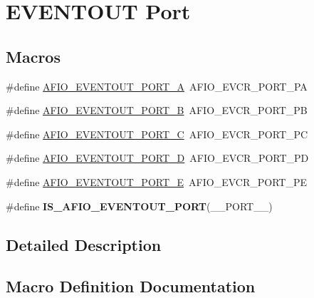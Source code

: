 \hypertarget{group___g_p_i_o_ex___e_v_e_n_t_o_u_t___p_o_r_t}{}\section{E\+V\+E\+N\+T\+O\+UT Port}
\label{group___g_p_i_o_ex___e_v_e_n_t_o_u_t___p_o_r_t}
\subsection*{Macros}
\begin{DoxyCompactItemize}
\item 
\#define \hyperlink{group___g_p_i_o_ex___e_v_e_n_t_o_u_t___p_o_r_t_ga923160935b624e039735fb52e0e3f848}{A\+F\+I\+O\+\_\+\+E\+V\+E\+N\+T\+O\+U\+T\+\_\+\+P\+O\+R\+T\+\_\+A}~A\+F\+I\+O\+\_\+\+E\+V\+C\+R\+\_\+\+P\+O\+R\+T\+\_\+\+PA
\item 
\#define \hyperlink{group___g_p_i_o_ex___e_v_e_n_t_o_u_t___p_o_r_t_ga6fcb0bbd79fa6194d268c8eda55637b8}{A\+F\+I\+O\+\_\+\+E\+V\+E\+N\+T\+O\+U\+T\+\_\+\+P\+O\+R\+T\+\_\+B}~A\+F\+I\+O\+\_\+\+E\+V\+C\+R\+\_\+\+P\+O\+R\+T\+\_\+\+PB
\item 
\#define \hyperlink{group___g_p_i_o_ex___e_v_e_n_t_o_u_t___p_o_r_t_gafed308a7c2b954b28e89b11e4087a6ea}{A\+F\+I\+O\+\_\+\+E\+V\+E\+N\+T\+O\+U\+T\+\_\+\+P\+O\+R\+T\+\_\+C}~A\+F\+I\+O\+\_\+\+E\+V\+C\+R\+\_\+\+P\+O\+R\+T\+\_\+\+PC
\item 
\#define \hyperlink{group___g_p_i_o_ex___e_v_e_n_t_o_u_t___p_o_r_t_gac7639a5273dd5f7be582b41b5d5e71b6}{A\+F\+I\+O\+\_\+\+E\+V\+E\+N\+T\+O\+U\+T\+\_\+\+P\+O\+R\+T\+\_\+D}~A\+F\+I\+O\+\_\+\+E\+V\+C\+R\+\_\+\+P\+O\+R\+T\+\_\+\+PD
\item 
\#define \hyperlink{group___g_p_i_o_ex___e_v_e_n_t_o_u_t___p_o_r_t_ga0aeff714f7ceb462a26915788adddefb}{A\+F\+I\+O\+\_\+\+E\+V\+E\+N\+T\+O\+U\+T\+\_\+\+P\+O\+R\+T\+\_\+E}~A\+F\+I\+O\+\_\+\+E\+V\+C\+R\+\_\+\+P\+O\+R\+T\+\_\+\+PE
\item 
\#define {\bfseries I\+S\+\_\+\+A\+F\+I\+O\+\_\+\+E\+V\+E\+N\+T\+O\+U\+T\+\_\+\+P\+O\+RT}(\+\_\+\+\_\+\+P\+O\+R\+T\+\_\+\+\_\+)
\end{DoxyCompactItemize}


\subsection{Detailed Description}


\subsection{Macro Definition Documentation}
\mbox{\label{group___g_p_i_o_ex___e_v_e_n_t_o_u_t___p_o_r_t_ga923160935b624e039735fb52e0e3f848}} 
